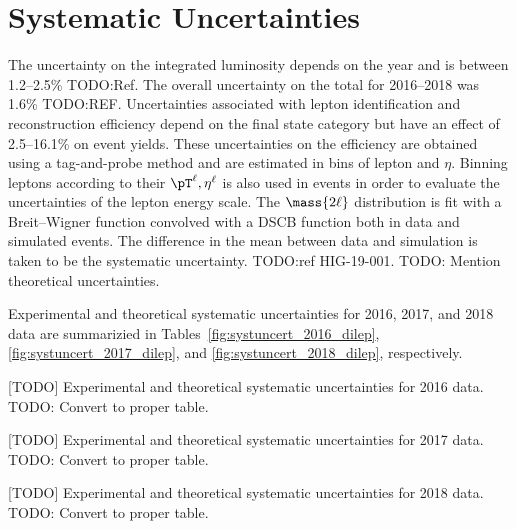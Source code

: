 \section{Systematic Uncertainties}
\label{sec:syst_uncert_dilep}
The uncertainty on the integrated luminosity depends on the year and is between 1.2--2.5\% TODO:Ref. %
The overall uncertainty on the total \lumiint for 2016--2018 was 1.6\% TODO:REF. %
Uncertainties associated with lepton identification and reconstruction efficiency depend on the final state category but have an effect of 2.5--16.1\% on event yields.
These uncertainties on the efficiency are obtained using a tag-and-probe method and are estimated in bins of lepton \pT and $\eta$.
Binning leptons according to their $\pT^\ell, \eta^\ell$ is also used in \ztolplm events in order to evaluate the uncertainties of the lepton energy scale.
The $\mass{2\ell}$ distribution is fit with a Breit--Wigner function convolved with a DSCB function both in data and simulated events.
The difference in the mean between data and simulation is taken to be the systematic uncertainty. TODO:ref HIG-19-001. %
TODO: Mention theoretical uncertainties.

Experimental and theoretical systematic uncertainties for 2016, 2017, and 2018 data are summarizied in Tables~\ref{fig:systuncert_2016_dilep}, \ref{fig:systuncert_2017_dilep}, and \ref{fig:systuncert_2018_dilep}, respectively.
\begin{multiFigure}
        \centering
            [TODO]
            {Experimental and theoretical systematic uncertainties for 2016 data. TODO: Convert to proper table.}
        \label{fig:systuncert_2016_dilep}
\end{multiFigure}
\begin{multiFigure}
        \centering
            [TODO]
            {Experimental and theoretical systematic uncertainties for 2017 data. TODO: Convert to proper table.}
        \label{fig:systuncert_2017_dilep}
\end{multiFigure}
\begin{multiFigure}
        \centering
            [TODO]
            {Experimental and theoretical systematic uncertainties for 2018 data. TODO: Convert to proper table.}
        \label{fig:systuncert_2018_dilep}
\end{multiFigure}